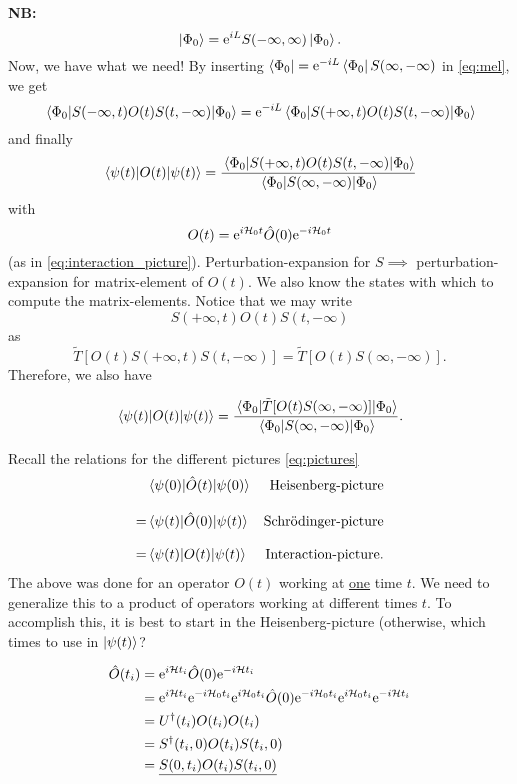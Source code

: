 \textbf{NB:} \[\ket{\Phi_0}= \mathrm{e}^{iL}S(-\infty, \infty)\ket{\Phi_0}.\]
Now, we have what we need! By inserting $\bra{\Phi_0}= \mathrm{e}^{-iL}\bra{\Phi_0}S(\infty, -\infty)$ in \cref{eq:mel}, we get
\begin{equation*} 
\ev{S(-\infty, t)O(t)S(t, -\infty)}{\Phi_0} = \e^{-iL}\ev{S(+\infty, t)O(t)S(t, -\infty)}{\Phi_0}
\end{equation*}
and finally 
\begin{equation}
	\ev{O(t)}{\psi(t)} = \frac{\ev{S(+\infty, t)O(t)S(t, -\infty)}{\Phi_0}}{\ev{S(\infty, -\infty)}{\Phi_0}}
\end{equation}
with \[O(t) = \mathrm{e}^{i\mathcal{H}_0 t}\hat{O}(0)\mathrm{e}^{-i\mathcal{H}_0 t}\] (as in \cref{eq:interaction_picture}).
Perturbation-expansion for $S \implies$ perturbation-expansion for matrix-element of $O(t)$. We also know the states with which to compute the matrix-elements. 
Notice that we may write 
\[
S(+\infty, t)O(t)S(t, -\infty)
\]
as 
\[\tilde{T}[O(t)S(+\infty, t)S(t, -\infty)] = \tilde{T}[O(t)S(\infty, -\infty)].\]
Therefore, we also have 
\begin{tcolorbox}
\begin{equation}
\label{eq:ev_single_op}
\ev{O(t)}{\psi(t)} = \frac{\ev{\tilde{T}[O(t)S(\infty, -\infty)]}{\Phi_0}}{\ev{S(\infty, -\infty)}{\Phi_0}}.
\end{equation}
\end{tcolorbox}

Recall the relations for the different pictures \cref{eq:pictures} 
\begin{align*}
\nonumber
&\ev{\hat{O}(t)}{\psi(0)} & \text{Heisenberg-picture} \\[2ex] 
= &\ev{\hat{O}(0)}{\psi(t)} & \text{Schrödinger-picture} \\[2ex]
= &\ev{O(t)}{\psi(t)} & \text{Interaction-picture}.
\nonumber
\end{align*}
The above was done for an operator $O(t)$ working at \underline{one} time $t$. We need to generalize this to a product of operators working at different times $t$. To accomplish this, it is best to start in the Heisenberg-picture (otherwise, which times to use in $\ket{\psi(t)}$? 


\begin{align}
\begin{split} 
\hat{O}(t_i) &= \mathrm{e}^{i\mathcal{H} t_i}\hat{O}(0)\mathrm{e}^{-i\mathcal{H} t_i} \\
&= \mathrm{e}^{i\mathcal{H} t_i}\mathrm{e}^{-i\mathcal{H}_0 t_i}\mathrm{e}^{i\mathcal{H}_0 t_i}\hat{O}(0)\mathrm{e}^{-i\mathcal{H}_0t_i}\mathrm{e}^{i\mathcal{H}_0t_i}\mathrm{e}^{-i\mathcal{H} t_i} \\
&= U^\dagger(t_i)O(t_i)O(t_i) \\
&=S^\dagger(t_i, 0)O(t_i)S(t_i, 0)\\
&=\underline{S(0, t_i)O(t_i)S(t_i, 0)}
\end{split}
\end{align}

